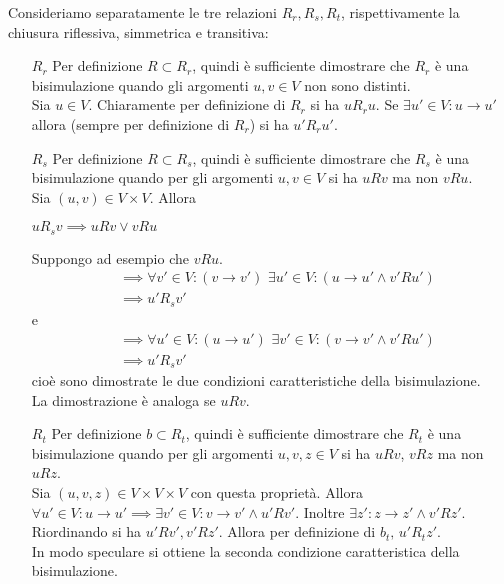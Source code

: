 \begin{proof2}
    Consideriamo separatamente le tre relazioni $R_r, R_s, R_t$, rispettivamente la chiusura riflessiva, simmetrica e transitiva:
    \begin{itemize}
        \item[$R_r$] Per definizione $R \subset R_r$, quindi è sufficiente dimostrare che $R_r$ è una bisimulazione quando gli argomenti $u,v \in V$ non sono distinti.\\
        Sia $u \in V$. Chiaramente per definizione di $R_r$ si ha $u R_r u$. Se $\exists u' \in V: u \to u'$ allora (sempre per definizione di $R_r$) si ha $u' R_r u'$.
        \item[$R_s$] Per definizione $R \subset R_s$, quindi è sufficiente dimostrare che $R_s$ è una bisimulazione quando per gli argomenti $u,v \in V$ si ha $u R v$ ma non $v R u$.\\
        Sia $(u,v) \in V\times V$. Allora
        \begin{center}
            $u R_s v \implies u R v \lor v R u$
        \end{center}
        Suppongo ad esempio che $v R u$.
        \begin{align*}
            &\implies \forall v' \in V: (v \to v') \,\,\exists u' \in V: (u \to u' \land v' R u')\\
            &\implies u' R_s v'
        \end{align*}
        e
        \begin{align*}
            &\implies \forall u' \in V: (u \to u') \,\,\exists v' \in V: (v \to v' \land v' R u')\\
            &\implies u' R_s v'
        \end{align*}
        cioè sono dimostrate le due condizioni caratteristiche della bisimulazione.\\
        La dimostrazione è analoga se $u R v$.
        \item[$R_t$] Per definizione $b \subset R_t$, quindi è sufficiente dimostrare che $R_t$ è una bisimulazione quando per gli argomenti $u,v,z \in V$ si ha $u R v$, $v R z$ ma non $u R z$.\\
        Sia $(u,v,z) \in V\times V\times V$ con questa proprietà. Allora $\forall u' \in V: u \to u' \implies \exists v' \in V: v \to v' \land u' R v'$. Inoltre $\exists z' : z \to z' \land v' R z'$.\\
        Riordinando si ha $u' R v', v' R z'$. Allora per definizione di $b_t, \, u' R_t z'$.\\
        In modo speculare si ottiene la seconda condizione caratteristica della bisimulazione.
    \end{itemize}
\end{proof2}
